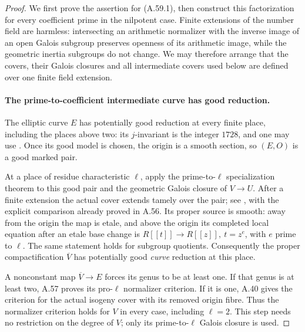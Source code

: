 \begin{proof}
We first prove the assertion for (A.59.1), then construct this
factorization for every coefficient prime in the nilpotent case.
Finite extensions of the number field are harmless: intersecting
an arithmetic normalizer with the inverse image of an open
Galois subgroup preserves openness of its arithmetic image,
while the geometric inertia subgroups do not change.
We may therefore arrange that the covers, their Galois closures
and all intermediate covers used below are defined over one
finite field extension.

\paragraph{The prime-to-coefficient intermediate curve has good reduction.}
The elliptic curve \(E\) has potentially good reduction at
every finite place, including the places above two: its
\(j\)-invariant is the integer \(1728\), and one may use
\cite[Proposition VII.5.5]{fghSilvermanAEC}. Once its good
model is chosen, the origin is a smooth section, so
\((E,O)\) is a good marked pair.

At a place of residue characteristic \(\ell\), apply the
prime-to-\(\ell\) specialization theorem to this good pair
and the geometric Galois closure of \(V\to U\). After a
finite extension the actual cover extends tamely over the pair;
see \cite[Expos\'e XIII, Corollary 2.9, Section 2.10 and
the proof of Corollary 2.12]{fghSGA1}, with the explicit
comparison already proved in A.56. Its proper source is smooth:
away from the origin the map is etale, and above the origin
its completed local equation after an etale base change is
\(R[[t]]\to R[[z]],\ t=z^e\), with \(e\) prime to
\(\ell\). The same statement holds for subgroup quotients.
Consequently the proper compactification \(\overline V\)
has potentially good \emph{curve} reduction at this place.

A nonconstant map \(\overline V\to E\) forces its genus
to be at least one. If that genus is at least two, A.57
proves its pro-\(\ell\) normalizer criterion. If it is
one, A.40 gives the criterion for the actual isogeny
cover with its removed origin fibre. Thus the normalizer
criterion holds for \(V\) in every case, including
\(\ell=2\). This step needs no restriction on the
degree of \(V\); only its prime-to-\(\ell\) Galois
closure is used.


\end{proof}
